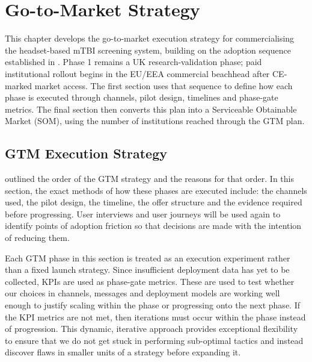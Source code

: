 \chapter{Go-to-Market Strategy}
\label{chapter:ent-gtm}


This chapter develops the go-to-market execution strategy for commercialising the headset-based mTBI screening system, building on the adoption sequence established in . Phase 1 remains a UK research-validation phase; paid institutional rollout begins in the EU/EEA commercial beachhead after CE-marked market access. The first section uses that sequence to define how each phase is executed through channels, pilot design, timelines and phase-gate metrics. The final section then converts this plan into a Serviceable Obtainable Market (SOM), using the number of institutions reached through the GTM plan.


\section{GTM Execution Strategy}
\label{sec:ent-gtm-execution}

 outlined the order of the GTM strategy and the reasons for that order. In this section, the exact methods of how these phases are executed include: the channels used, the pilot design, the timeline, the offer structure and the evidence required before progressing. User interviews and user journeys will be used again to identify points of adoption friction so that decisions are made with the intention of reducing them.

Each GTM phase in this section is treated as an execution experiment rather than a fixed launch strategy. Since insufficient deployment data has yet to be collected, KPIs are used as phase-gate metrics. These are used to test whether our choices in channels, messages and deployment models are working well enough to justify scaling within the phase or progressing onto the next phase. If the KPI metrics are not met, then iterations must occur within the phase instead of progression. This dynamic, iterative approach provides exceptional flexibility to ensure that we do not get stuck in performing sub-optimal tactics and instead discover flaws in smaller units of a strategy before expanding it.

